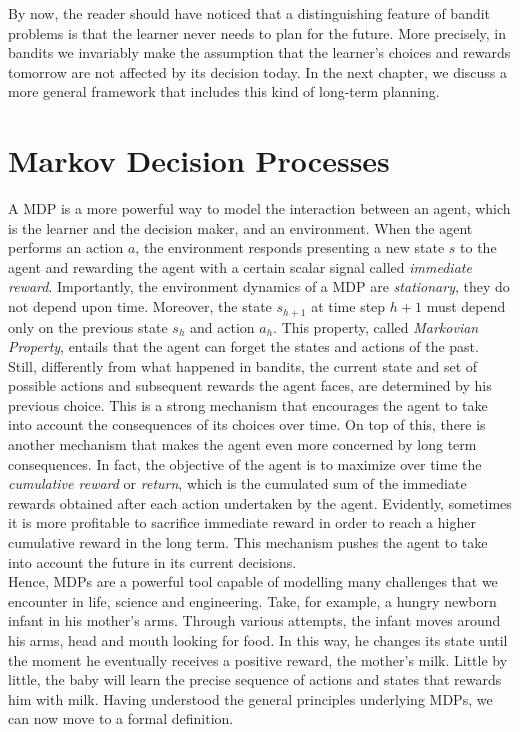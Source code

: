 By now, the reader should have noticed that a distinguishing feature of bandit problems is that the learner never needs to plan for the future. More precisely, in bandits we invariably make the assumption that the learner’s choices and rewards tomorrow are not affected by its decision today. In the next chapter, we discuss a more general framework that includes this kind of long-term planning.

\section{Markov Decision Processes}
A \gls{MDP} is a more powerful way to model the interaction between an agent, which is the learner and the decision maker, and an environment. When the agent performs an action $a$, the environment responds presenting a new state $s$ to the agent and rewarding the agent with a certain scalar signal called \emph{immediate reward}. Importantly, the environment dynamics of a \gls{MDP} are \emph{stationary}, \ie they do not depend upon time. Moreover, the state $s_{h+1}$ at time step $h+1$ must depend only on the previous state $s_{h}$ and action   $a_{h}$. This property, called \emph{Markovian Property}, entails that the agent can forget the states and actions of the past. Still, differently from what happened in bandits, the current state and set of possible actions and subsequent rewards the agent faces, are determined by his previous choice. This is a strong mechanism that encourages the agent to take into account the consequences of its choices over time. On top of this, there is another mechanism that makes the agent even more concerned by long term consequences. In fact, the objective of the agent is to maximize over time the  \emph{cumulative reward} or \emph{return}, which is the cumulated sum of the immediate rewards obtained after each action undertaken by the agent. Evidently, sometimes it is more profitable to sacrifice immediate reward in order to reach a higher cumulative reward in the long term. This mechanism pushes the agent to take into account the future in its current decisions. \\
Hence, \gls{MDP}s are a powerful tool capable of modelling many challenges that we encounter in life, science and engineering. Take, for example, a hungry newborn infant in his mother's arms. Through various attempts, the infant moves around his arms, head and mouth looking for food. In this way, he changes its state until the moment he eventually receives a positive reward, the mother's milk. Little by little, the baby will learn the precise sequence of actions and states that rewards him with milk. Having understood the general principles underlying \gls{MDP}s, we can now move to a formal definition.

